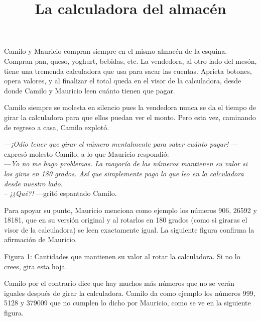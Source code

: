 \documentclass{oci}
\title{La calculadora del almacén}
\begin{document}
\begin{problemDescription}

Camilo y Mauricio compran siempre en el mismo almacén de la esquina. %
Compran pan, queso, yoghurt, bebidas, etc. 
La vendedora, al otro lado del mesón, tiene una tremenda calculadora que usa para sacar las cuentas. 
Aprieta botones, opera valores, y al finalizar el total queda en el visor de la calculadora, 
desde donde Camilo y Mauricio leen cuánto tienen que pagar.

Camilo siempre se molesta en silencio pues la vendedora nunca se da el tiempo de girar la calculadora para que ellos puedan ver el monto.
Pero esta vez, caminando de regreso a casa, Camilo explotó.

---\emph{¡Odio tener que girar el número mentalmente para saber cuánto pagar!} ---expresó molesto Camilo, a lo que Mauricio respondió: \\
---\emph{Yo no me hago problemas. La mayoría de las números mantienen su valor si los giras en 180 grados. Así que simplemente pago lo que leo en la calculadora desde nuestro lado.} \\
-- \emph{¡¿Qué?!} ---gritó espantado Camilo.

Para apoyar su punto, Mauricio menciona como ejemplo los números 906, 26592 y
18181, que en su versión original y al rotarlos en 180 grados (como si giraras
el visor de la calculadora) se leen exactamente igual. La siguiente figura
confirma la afirmación de Mauricio.

\bigskip
\bigskip

\begin{center}
\resizebox{!}{40pt}{} \hspace*{50pt}  
\resizebox{!}{40pt}{} \hspace*{50pt}  
\resizebox{!}{40pt}{}\bigskip

{Figura 1: Cantidades que mantienen su valor al rotar la calculadora. Si no lo crees, gira esta hoja.}
\end{center}

\bigskip
\bigskip


Camilo por el contrario dice que hay muchos más números que no se verán iguales después de girar la calculadora.
Camilo da como ejemplo los números 999, 5128 y 379009 que no cumplen lo dicho por Mauricio, como se ve en la siguiente figura.


\end{problemDescription}
\end{document}

